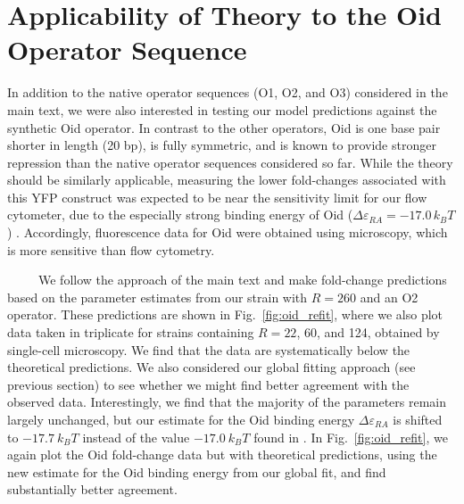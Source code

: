\documentclass[12pt]{caltech_thesis}
\begin{document}
\hypertarget{applicability-of-theory-to-the-oid-operator-sequence}{%
\section{Applicability of Theory to the Oid Operator
Sequence}\label{applicability-of-theory-to-the-oid-operator-sequence}}

In addition to the native operator sequences (O1, O2, and O3) considered
in the main text, we were also interested in testing our model
predictions against the synthetic Oid operator. In contrast to the other
operators, Oid is one base pair shorter in length (20 bp), is fully
symmetric, and is known to provide stronger repression than the native
operator sequences considered so far. While the theory should be
similarly applicable, measuring the lower fold-changes associated with
this YFP construct was expected to be near the sensitivity limit for our
flow cytometer, due to the especially strong binding energy of Oid
(\(\Delta \varepsilon_{RA}=-17.0\,k_BT\)) \autocite{garcia2011}.
Accordingly, fluorescence data for Oid were obtained using microscopy,
which is more sensitive than flow cytometry.

~~~~~We follow the approach of the main text and make fold-change
predictions based on the parameter estimates from our strain with
\(R=260\) and an O2 operator. These predictions are shown in
Fig.~\ref{fig:oid_refit}, where we also plot data taken in triplicate
for strains containing \(R= 22\), 60, and 124, obtained by single-cell
microscopy. We find that the data are systematically below the
theoretical predictions. We also considered our global fitting approach
(see previous section) to see whether we might find better agreement
with the observed data. Interestingly, we find that the majority of the
parameters remain largely unchanged, but our estimate for the Oid
binding energy \(\Delta \varepsilon_{RA}\) is shifted to \(-17.7~k_BT\)
instead of the value \(-17.0~k_BT\) found in \textcite{garcia2011}. In
Fig.~\ref{fig:oid_refit}, we again plot the Oid fold-change data but
with theoretical predictions, using the new estimate for the Oid binding
energy from our global fit, and find substantially better agreement.
\end{document}
